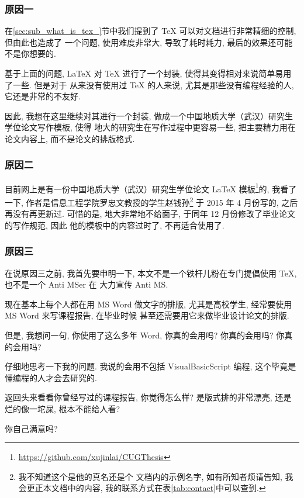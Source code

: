 \documentclass[bachelor]{cugthesis}
\begin{document}
\subsubsection{原因一}
    在\ref{sec:sub_what_is_tex_}节中我们提到了 \TeX{} 可以对文档进行非常精细的控制, 但由此也造成了
    一个问题, 使用难度非常大, 导致了耗时耗力, 最后的效果还可能不是你想要的. 

    基于上面的问题, \LaTeX{} 对 \TeX{} 进行了一个封装, 使得其变得相对来说简单易用了一些. 但是对于
    从来没有使用过 \TeX{} 的人来说, 尤其是那些没有编程经验的人, 它还是非常的不友好. 

    因此, 我想在这里继续对其进行一个封装, 做成一个中国地质大学（武汉）研究生学位论文写作模板, 使得
    地大的研究生在写作过程中更容易一些, 把主要精力用在论文内容上, 而不是论文的排版格式. 

\subsubsection{原因二}
    目前网上是有一份中国地质大学（武汉）研究生学位论文 \LaTeX{} 模板\footnote{\url{https://github.com/xujinlai/CUGThesis}}的, 
    我看了一下, 作者是信息工程学院罗忠文教授的学生赵钱孙\footnote{我不知道这个是他的真名还是个
    文档内的示例名字, 如有所知者烦请告知, 我会更正本文档中的内容, 我的联系方式在表\ref{tab:contact}中可以查到. }
    于 2015 年 4 月份写的, 之后再没有再更新过. 可惜的是, 地大非常地不给面子, 于同年 12 月份修改了毕业论文的写作规范, 因此
    他的模板中的内容过时了, 不再适合使用了.
    
\subsubsection{原因三}
    在说原因三之前, 我首先要申明一下, 本文不是一个铁杆儿粉在专门提倡使用 \TeX{}, 也不是一个 Anti MSer 在
    大力宣传 Anti MS. 

    现在基本上每个人都在用 MS Word 做文字的排版, 尤其是高校学生, 经常要使用 MS Word 来写课程报告, 在毕业时候
    甚至还需要用它来做毕业设计论文的排版. 

    但是, 我想问一句, 你使用了这么多年 Word, 你真的会用吗? 你真的会用吗? 你真的会用吗? 

    仔细地思考一下我的问题. 我说的会用不包括 VisualBasicScript 编程, 这个毕竟是懂编程的人才会去研究的.

    返回头来看看你曾经写过的课程报告, 你觉得怎么样? 是版式排的非常漂亮, 还是烂的像一坨屎, 根本不能给人看?

    你自己满意吗?
\end{document}
